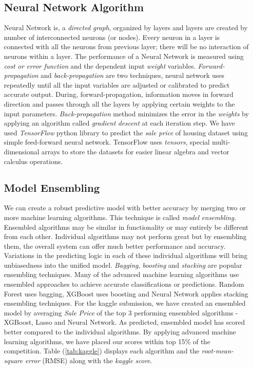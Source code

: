 \documentclass[sigconf]{acmart}
\begin{document}
	\subsection{Neural Network Algorithm}
	Neural Network is, a {\em directed graph}, organized by layers and layers are created by number of interconnected neurons (or nodes). Every neuron in a layer is connected with all the neurons from previous layer; there will be no interaction of neurons within a layer. The performance of a Neural Network is measured using {\em cost or error function} and the dependent input {\em weight} variables. {\em Forward-propagation} and {\em back-propagation} are two techniques, neural network uses repeatedly until all the input variables are adjusted or calibrated to predict accurate output. During, forward-propagation, information moves in forward direction and passes through all the layers by applying certain weights to the input parameters. {\em Back-propagation} method minimizes the error in the {\em weights} by applying an algorithm called {\em gradient descent} at each iteration step. We have used {\em TensorFlow} python library to predict the {\em sale price} of housing dataset using simple feed-forward neural network. TensorFlow uses {\em tensors}, special multi-dimensional arrays to store the datasets for easier linear algebra and vector calculus operations.
			
	\subsection{Model Ensembling}
	We can create a robust predictive model with better accuracy by merging two or more machine learning algorithms. This technique is called {\em model ensembling}. Ensembled algorithms may be similar in functionality or may entirely be different from each other. Individual algorithms may not perform great but by ensembling them, the overall system can offer much better performance and accuracy. Variations in the predicting logic in each of these individual algorithms will bring unbiasedness into the unified model. {\em Bagging}, {\em boosting} and {\em stacking} are popular ensembling techniques. Many of the advanced machine learning algorithms use ensembled approaches to achieve accurate classifications or predictions. Random Forest uses bagging, XGBoost uses boosting and Neural Network applies stacking ensembling techniques. For the kaggle submission, we have created an ensembled model by averaging {\em Sale Price} of the top 3 performing ensembled algorithms - XGBoost, Lasso and Neural Network. As predicted, ensembled model has scored better compared to the individual algorithms. By applying advanced machine learning algorithms, we have placed our scores within top 15\% of the competition. Table (\ref{tab:kaggle}) displays each algorithm and the {\em root-mean-square error} (RMSE) along with the {\em kaggle score}.
					
\end{document}

